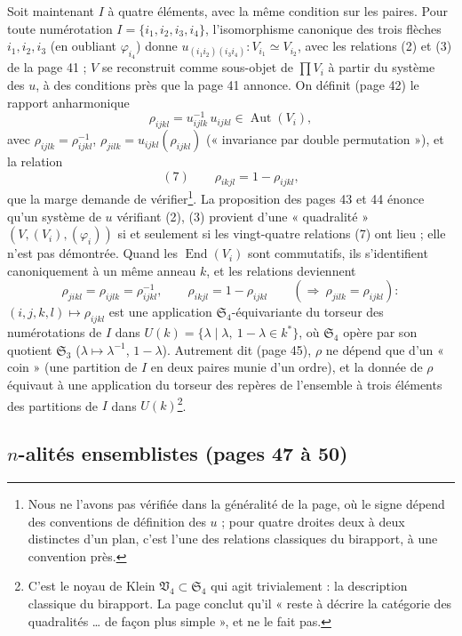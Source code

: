 \documentclass[11pt,a4paper]{article}
\begin{document}
Soit maintenant $I$ à quatre éléments, avec la même condition sur les paires.
Pour toute numérotation $I = \{i_1, i_2, i_3, i_4\}$, l'isomorphisme
canonique des trois flèches $i_1, i_2, i_3$ (en oubliant $\varphi_{i_4}$)
donne $u_{(i_1 i_2)(i_3 i_4)} : V_{i_1} \simeq V_{i_2}$, avec les relations (2)
et (3) de la page 41 ; $V$ se reconstruit comme sous-objet de $\prod V_i$ à
partir du système des $u$, à des conditions près que la page 41 annonce. On
définit (page 42) le rapport anharmonique
\[
  \rho_{ijkl} = u_{ijlk}^{-1}\,u_{ijkl} \in \operatorname{Aut}(V_i),
\]
avec $\rho_{ijlk} = \rho_{ijkl}^{-1}$, $\rho_{jilk} = u_{ijkl}(\rho_{ijkl})$
(« invariance par double permutation »), et la relation
\[
  (7)\qquad \rho_{ikjl} = 1 - \rho_{ijkl},
\]
que la marge demande de vérifier\footnote{Nous ne l'avons pas vérifiée dans
la généralité de la page, où le signe dépend des conventions de définition des
$u$ ; pour quatre droites deux à deux distinctes d'un plan, c'est l'une des
relations classiques du birapport, à une convention près.}. La proposition
des pages 43 et 44 énonce qu'un système de $u$ vérifiant (2), (3)
provient d'une « quadralité » $(V, (V_i), (\varphi_i))$ si et seulement si les
vingt-quatre relations (7) ont lieu ; elle n'est pas démontrée. Quand les
$\operatorname{End}(V_i)$ sont commutatifs, ils s'identifient canoniquement à
un même anneau $k$, et les relations deviennent
\[
  \rho_{jikl} = \rho_{ijlk} = \rho_{ijkl}^{-1},\qquad \rho_{ikjl} = 1 - \rho_{ijkl}
  \qquad(\Rightarrow\ \rho_{jilk} = \rho_{ijkl}) :
\]
$(i, j, k, l) \mapsto \rho_{ijkl}$ est une application
$\mathfrak{S}_4$-équivariante du torseur des numérotations de $I$ dans
$U(k) = \{\lambda \mid \lambda,\ 1 - \lambda \in k^{*}\}$, où $\mathfrak{S}_4$
opère par son quotient $\mathfrak{S}_3$ ($\lambda \mapsto \lambda^{-1}$, $1 -
\lambda$). Autrement dit (page 45), $\rho$ ne dépend que d'un « coin » (une
partition de $I$ en deux paires munie d'un ordre), et la donnée de $\rho$
équivaut à une application du torseur des repères de l'ensemble à trois
éléments des partitions de $I$ dans $U(k)$\footnote{C'est le noyau de Klein
$\mathfrak{V}_4 \subset \mathfrak{S}_4$ qui agit trivialement : la
description classique du birapport. La page conclut qu'il « reste à décrire
la catégorie des quadralités … de façon plus simple », et ne le fait pas.}.

\subsection*{$n$-alités ensemblistes (pages 47 à 50)}
\end{document}
